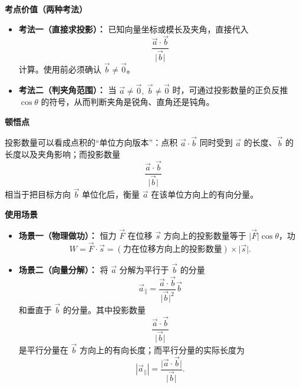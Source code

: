 \begin{explanationbox}
	\medskip
	\textbf{\textcolor{CExplanation}{考点价值（两种考法）}}
	\begin{itemize}[leftmargin=*, itemsep=0.5em, topsep=0.4em]
		\item \textbf{考法一（直接求投影）：} 已知向量坐标或模长及夹角，直接代入
		      \[
			      \frac{\vec a\cdot\vec b}{\lvert\vec b\rvert}
		      \]
		      计算。使用前必须确认 $\vec b\neq\vec 0$。

		\item \textbf{考法二（判夹角范围）：} 当 $\vec a\neq\vec 0,\ \vec b\neq\vec 0$ 时，可通过投影数量的正负反推 $\cos\theta$ 的符号，从而判断夹角是锐角、直角还是钝角。
	\end{itemize}

	\medskip
	\textbf{\textcolor{CExplanation}{顿悟点}}

	投影数量可以看成点积的“单位方向版本”：点积 $\vec a\cdot\vec b$ 同时受到 $\vec a$ 的长度、$\vec b$ 的长度以及夹角影响；而投影数量
	\[
		\frac{\vec a\cdot\vec b}{\lvert\vec b\rvert}
	\]
	相当于把目标方向 $\vec b$ 单位化后，衡量 $\vec a$ 在该单位方向上的有向分量。

	\medskip
	\textbf{\textcolor{CExplanation}{使用场景}}
	\begin{itemize}[leftmargin=*, itemsep=0.5em, topsep=0.4em]
		\item \textbf{场景一（物理做功）：} 恒力 $\vec F$ 在位移 $\vec s$ 方向上的投影数量等于 $\lvert\vec F\rvert\cos\theta$，功
		      \[
			      W=\vec F\cdot\vec s=(\text{力在位移方向上的投影数量})\times \lvert\vec s\rvert .
		      \]

		\item \textbf{场景二（向量分解）：} 将 $\vec a$ 分解为平行于 $\vec b$ 的分量
		      \[
			      \vec a_{\parallel}
			      =
			      \frac{\vec a\cdot\vec b}{\lvert\vec b\rvert^2}\vec b
		      \]
		      和垂直于 $\vec b$ 的分量。其中投影数量
		      \[
			      \frac{\vec a\cdot\vec b}{\lvert\vec b\rvert}
		      \]
		      是平行分量在 $\vec b$ 方向上的有向长度；而平行分量的实际长度为
		      \[
			      \left\lvert \vec a_{\parallel}\right\rvert
			      =
			      \frac{\lvert\vec a\cdot\vec b\rvert}{\lvert\vec b\rvert}.
		      \]
	\end{itemize}
\end{explanationbox}